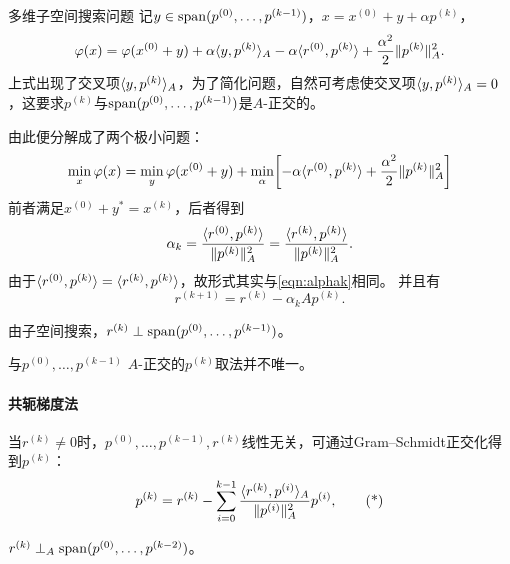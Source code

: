 \begin{theorem}
    {多维子空间搜索问题}{}
    记$y \in \operatorname{span}(p^{(0)},\ldots,p^{(k-1)})$，$x = x^{(0)} + y + \alpha p^{(k)}$，
    \[
        \varphi(x) = \varphi(x^{(0)} + y) + \alpha\langle y,p^{(k)}\rangle_A - \alpha\langle r^{(0)},p^{(k)}\rangle + \frac{\alpha^2}2\lVert p^{(k)}\rVert^2_A.
    \]
    上式出现了交叉项$\langle y,p^{(k)}\rangle_A$，为了简化问题，自然可考虑使交叉项$\langle y,p^{(k)}\rangle_A = 0$，这要求$p^{(k)}$与$\operatorname{span}(p^{(0)},\ldots,p^{(k-1)})$是$A$-正交的。%

    由此便分解成了两个极小问题：
    \[
        \min_x\varphi(x) = \min_y\varphi(x^{(0)} + y) + \min_\alpha\biggl[-\alpha\langle r^{(0)},p^{(k)}\rangle + \frac{\alpha^2}2\lVert p^{(k)}\rVert^2_A\biggr]
    \]
    前者满足$x^{(0)} + y^* = x^{(k)}$，后者得到
    \begin{equation}
        \alpha_k = \frac{\langle r^{(0)},p^{(k)}\rangle}{\lVert p^{(k)}\rVert_A^2} = \frac{\langle r^{(k)},p^{(k)}\rangle}{\lVert p^{(k)}\rVert_A^2}.
    \end{equation}
    由于$\langle r^{(0)},p^{(k)}\rangle = \langle r^{(k)},p^{(k)}\rangle$，故形式其实与\eqref{eqn:alphak}相同。
    并且有
    \begin{equation}
        \label{eqn:r^k+1=r^k-alpha_kAp^k}
        r^{(k+1)} = r^{(k)} - \alpha_kAp^{(k)}.
    \end{equation}
\end{theorem}

\begin{corollary}
    由子空间搜索，$r^{(k)} \perp \operatorname{span}(p^{(0)},\ldots,p^{(k-1)})$。
\end{corollary}

\begin{remark}
    与$p^{(0)},\ldots,p^{(k-1)}$ $A$-正交的$p^{(k)}$取法并不唯一。
\end{remark}

\paragraph{共轭梯度法}

当$r^{(k)} \neq 0$时，$p^{(0)},\ldots,p^{(k-1)},r^{(k)}$线性无关，可通过Gram--Schmidt正交化得到$p^{(k)}$：
\begin{equation}
    \label{eqn:Gram-Schmidt p^k}
    p^{(k)} = r^{(k)} - \sum_{i=0}^{k-1}\frac{\langle r^{(k)},p^{(i)}\rangle_A}{\lVert p^{(i)}\rVert_A^2}p^{(i)},
    \tag{*}
\end{equation}

\begin{theorem}
    {}{}
    $r^{(k)} \perp_A\operatorname{span}(p^{(0)},\ldots,p^{(k-2)})$。
\end{theorem}

